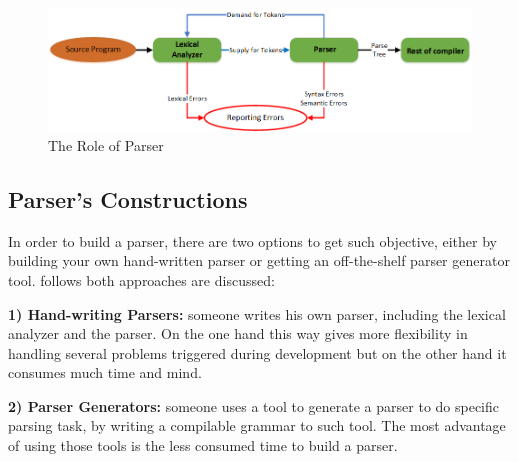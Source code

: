 \begin{figure}[ht]
	\begin{center}
		\includegraphics[scale=0.55,angle=0]{images/ParserRole}
		\caption{The Role of Parser}
		\label{Fig:parserPosition}
	\end{center}
\end{figure}
\subsection{Parser's Constructions}
In order to build a parser, there are two options to get such objective, either by building your own hand-written parser or getting an off-the-shelf parser generator tool. follows both approaches are discussed:
\par \textbf{1) Hand-writing Parsers:} someone writes his own parser, including the lexical analyzer and the parser. On the one hand this way gives more flexibility in handling several problems triggered during development but on the other hand it consumes much time and mind.
\par \textbf{2) Parser Generators:} someone uses a tool to generate a parser to do specific parsing task, by writing a compilable grammar to such tool. The most advantage of using those tools is the less consumed time to build a parser.  

